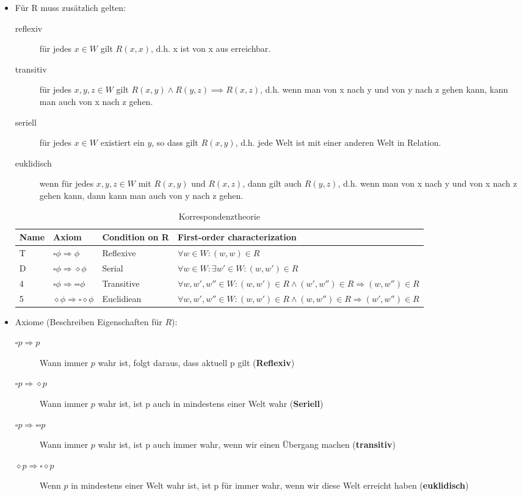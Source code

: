 \documentclass{article} %
\begin{document}
\begin{itemize}
\begin{itemize}
			\item Für R muss zusätzlich gelten:
			\begin{description}
				\item[reflexiv] für jedes $x \in W$ gilt $R(x,x)$, d.h. x ist von x aus erreichbar.
				\item[transitiv] für jedes $x,y,z \in W$ gilt $R(x,y) \wedge R(y,z) \implies R(x,z)$, d.h. wenn man von x nach y und von y nach z gehen kann, kann man auch von x nach z gehen.
				\item[seriell] für jedes $x \in W$ existiert ein $y$, so dass gilt $R(x,y)$, d.h. jede Welt ist mit einer anderen Welt in Relation.
				\item[euklidisch] wenn für jedes $x,y,z \in W$ mit $R(x,y)$ und $R(x,z)$, dann gilt auch $R(y,z)$, d.h. wenn man von x nach y und von x nach z gehen kann, dann kann man auch von y nach z gehen.\\
				
			\end{description}
			\begin{table}[h]
				\centering
				\label{my-label}
				\begin{tabular}{llll}
					\hline
					Name & Axiom                          & Condition on R & First-order characterization \\ \hline
					T    & $\square\phi \Rightarrow \phi$ & Reflexive      & $\forall w\in W:(w,w)\in R$  \\
					D & $\square\phi \Rightarrow \diamond\phi$ &        Serial        &$\forall w \in W : \exists w' \in W: (w,w')\in R$\\
					4&$\square\phi\Rightarrow\square\square\phi$ &            Transitive    & $\forall w,w',w''\in W: (w,w')\in R \wedge (w',w'')\in R \Rightarrow (w,w'') \in R$ \\
					5 &$\diamond\phi\Rightarrow\square\diamond\phi$&     Euclidiean           & $\forall w,w',w'' \in W : (w,w') \in R \wedge (w,w'') \in R \Rightarrow (w',w'') \in R$\\ \hline
				\end{tabular}
		\caption{Korrespondenztheorie}
			\end{table}
			\item Axiome (Beschreiben Eigenschaften für $R$):
			\begin{description}
				\item[$\square p \Rightarrow p$] Wann immer $p$ wahr ist, folgt daraus, dass aktuell p gilt (\textbf{Reflexiv})
				\item[$\square p \Rightarrow \diamond p$]Wann immer $p$ wahr ist, ist p auch in mindestens einer Welt wahr (\textbf{Seriell})
				\item[$\square p \Rightarrow \square \square p$]Wann immer $p$ wahr ist, ist p auch immer wahr, wenn wir einen Übergang machen (\textbf{transitiv})
				\item[$\diamond p \Rightarrow \square \diamond p$] Wenn $p$ in mindestens einer Welt wahr ist, ist p für immer wahr, wenn wir diese Welt erreicht haben (\textbf{euklidisch})\\
				

\end{description}
\end{itemize}
\end{itemize}
\end{document}
